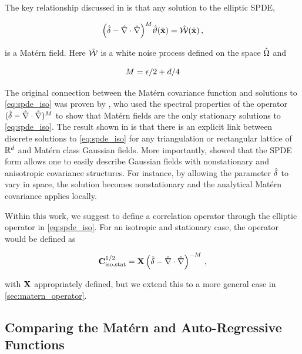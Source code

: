 The key relationship discussed in \citet{RSSB:RSSB777} is that any solution to
the elliptic SPDE,
\begin{linenomath*}\begin{equation}
    \Big(\hat{\delta} - \hat{\nabla}\cdot\hat{\nabla}\Big)^{M}\hat{\vartheta}(\hat{\mathbf{x}}) =
    \hat{\mathcal{W}}(\hat{\mathbf{x}}) \, ,
    \label{eq:spde_iso}
\end{equation}\end{linenomath*}
is a Mat\'ern field.
Here
$\hat{\mathcal{W}}$ is a white noise process defined on the space $\hat{\Omega}$ and
\begin{linenomath*}\begin{equation}
    M = \epsilon/2 + d/4
    \label{eq:meandiff}
\end{equation}\end{linenomath*}
The original connection between the Mat\'ern covariance function and solutions
to \cref{eq:spde_iso} was proven by
\cite{whittle_stationary_1954,whittle1963stochastic}, who
used the spectral properties of the operator $(\hat{\delta} -
\hat{\nabla}\cdot\hat{\nabla})^M$ to show that Mat\'ern fields are the only
stationary solutions to \cref{eq:spde_iso}.
The result shown in \citet{RSSB:RSSB777} is
that there is an explicit link between discrete solutions to
\cref{eq:spde_iso} for any triangulation or rectangular lattice of $\mathbb{R}^{d}$
and Mat\'ern class Gaussian fields.
More importantly, \citet{RSSB:RSSB777} showed that the SPDE form allows
one to easily describe Gaussian fields with nonstationary and anisotropic covariance structures.
For instance, by allowing the parameter $\hat{\delta}$ to vary in space, the solution
becomes nonstationary and the analytical Mat\'ern covariance applies locally.

Within this work, we suggest to define a correlation operator through the
elliptic operator in \cref{eq:spde_iso}.
For an isotropic and stationary case, the operator would be defined as
\begin{linenomath*}\begin{equation}
    \mathbf{C}^{1/2}_\text{iso,stat} = \mathbf{X} \left(\hat{\delta} -
    \hat{\nabla}\cdot\hat{\nabla}\right)^{-M} \, ,
    \label{eq:matern_corr_isostat}
\end{equation}\end{linenomath*}
with $\mathbf{X}$ appropriately defined, but we extend this to a more general
case in \cref{sec:matern_operator}.


\subsection{Comparing the Mat\'ern and Auto-Regressive Functions}
\label{ssec:correlation_comparison}

